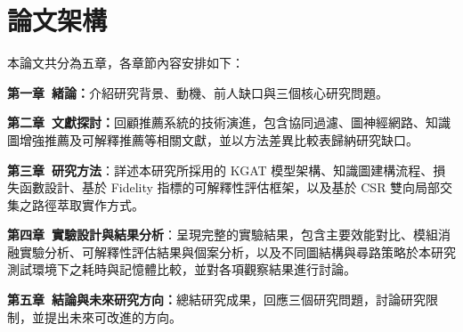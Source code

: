 \section{論文架構}

本論文共分為五章，各章節內容安排如下：

\textbf{第一章~緒論：}介紹研究背景、動機、前人缺口與三個核心研究問題。

\textbf{第二章~文獻探討：}回顧推薦系統的技術演進，包含協同過濾、圖神經網路、知識圖增強推薦及可解釋推薦等相關文獻，並以方法差異比較表歸納研究缺口。

\textbf{第三章~研究方法}：詳述本研究所採用的 KGAT 模型架構、知識圖建構流程、損失函數設計、基於 Fidelity 指標的可解釋性評估框架，以及基於 CSR 雙向局部交集之路徑萃取實作方式。

\textbf{第四章~實驗設計與結果分析}：呈現完整的實驗結果，包含主要效能對比、模組消融實驗分析、可解釋性評估結果與個案分析，以及不同圖結構與尋路策略於本研究測試環境下之耗時與記憶體比較，並對各項觀察結果進行討論。

\textbf{第五章~結論與未來研究方向：}總結研究成果，回應三個研究問題，討論研究限制，並提出未來可改進的方向。
